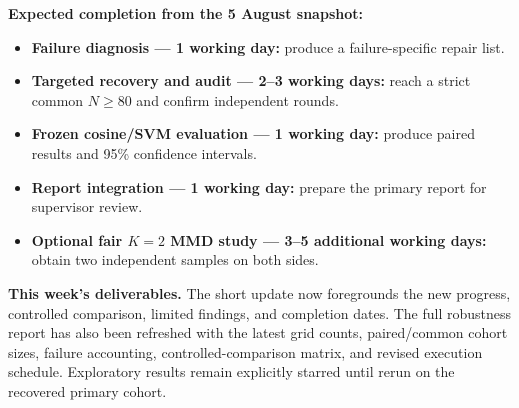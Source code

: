 \documentclass[10pt,a4paper]{article}
\begin{document}
\textbf{Expected completion from the 5 August snapshot:}
\begin{itemize}
  \item \textbf{Failure diagnosis --- 1 working day:} produce a
        failure-specific repair list.
  \item \textbf{Targeted recovery and audit --- 2--3 working days:} reach a
        strict common $N\geq80$ and confirm independent rounds.
  \item \textbf{Frozen cosine/SVM evaluation --- 1 working day:} produce paired
        results and 95\% confidence intervals.
  \item \textbf{Report integration --- 1 working day:} prepare the primary
        report for supervisor review.
  \item \textbf{Optional fair $K=2$ MMD study --- 3--5 additional working
        days:} obtain two independent samples on both sides.
\end{itemize}

\textbf{This week's deliverables.} The short update now foregrounds the new
progress, controlled comparison, limited findings, and completion dates. The
full robustness report has also been refreshed with the latest grid counts,
paired/common cohort sizes, failure accounting, controlled-comparison matrix,
and revised execution schedule. Exploratory results remain explicitly starred
until rerun on the recovered primary cohort.
\end{document}
